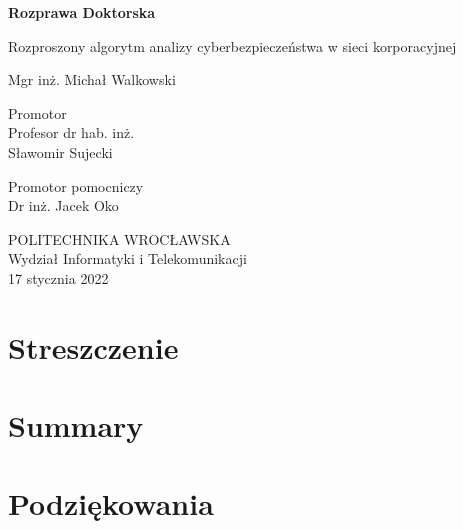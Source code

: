 \documentclass[12pt, oneside]{book}
\begin{document}
\begin{titlepage}
\begin{center}

\vspace*{2cm}

{\huge \textbf{Rozprawa Doktorska}}
\vspace{2cm}

{\huge Rozproszony algorytm analizy cyberbezpieczeństwa w sieci korporacyjnej}

\vspace{2cm}

{\large Mgr inż. Michał Walkowski}


\begin{flushright}
\vspace{2cm}
{Promotor\\Profesor dr hab. inż.\\ Sławomir Sujecki}

\vspace{0.5cm}
{Promotor pomocniczy\\Dr inż. Jacek Oko}
\end{flushright}

\vfill

\vspace*{3cm}

POLITECHNIKA WROCŁAWSKA\\
Wydział Informatyki i Telekomunikacji\\
17 stycznia 2022
\end{center}
\end{titlepage}

\frontmatter 
\onehalfspacing

\chapter{Streszczenie}


\chapter{Summary}


\chapter{Podziękowania}


\chapter*{}

\end{document}
